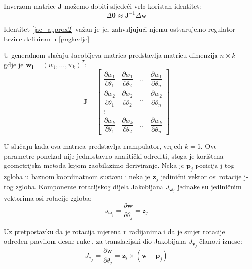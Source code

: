 \documentclass[times, utf8, diplomski, numeric]{fer}
\begin{document}
Inverzom matrice $\mathbf{J}$ možemo dobiti sljedeći vrlo koristan identitet:
\begin{equation}
\Delta \bm{\theta} \approx \mathbf{J}^{-1} \Delta \textbf{w}
\label{jac_approx2}
\end{equation}

Identitet \ref{jac_approx2} važan je jer zahvaljujući njemu ostvarujemo regulator brzine definiran u [poglavlje].

U generalnom slučaju Jacobijeva matrica predstavlja matricu dimenzija $n \times k$ gdje je $\mathbf{w_i} = (w_1, \ldots , w_k)^T$:
\begin{equation}
\mathbf{J} =
\begin{bmatrix}
    \dfrac{\partial {w_1}}{\partial \theta_{1}}      & \dfrac{\partial {w}_{1}}{\partial \theta_{2}}  & \dots & \dfrac{\partial {w}_{1}}{\partial \theta_{n}}  \\
    \dfrac{\partial{w}_{2}}{\partial \theta_{1}}      & \dfrac{\partial {w}_{2}}{\partial \theta_{2}}  & \dots & \dfrac{\partial {w}_{2}}{\partial \theta_{n}} \\
    \vdots \\
    \dfrac{\partial {w}_{k}}{\partial \theta_{1}}      & \dfrac{\partial {w}_{k}}{\partial \theta_{2}}  & \dots & \dfrac{\partial {w}_{k}}{\partial \theta_{n}}
\end{bmatrix}
\end{equation}

U slučaju kada ova matrica predstavlja manipulator, vrijedi $k=6$.
Ove parametre ponekad nije jednostavno analitički odrediti, stoga je korištena geometrijska metoda kojom zaobilazimo deriviranje. 
Neka je $\mathbf{p}_{j}$ pozicija j-tog zgloba u baznom koordinatnom sustavu i neka je $\mathbf{z}_{j}$ jedinični vektor osi rotacije j-tog zgloba. 
Komponente rotacijskog dijela Jakobijana $J_{\bm{\omega}_j}$ jednake su jediničnim vektorima osi rotacije zgloba: 
\begin{equation}
J_{\bm{\omega}_j} = \dfrac{\partial \textbf{w}}{ \partial \theta_{j}} = \textbf{z}_{j}
\end{equation}


Uz pretpostavku da je rotacija mjerena u radijanima i da je smjer rotacije određen pravilom desne ruke , za translacijski dio Jakobijana $J_{\bm{v}_j}$ članovi iznose:
\begin{equation}
J_{\bm{v}_j} = \dfrac{\partial \mathbf{w}}{ \partial \theta_{j}} = \mathbf{z}_{j} \times (\mathbf{w} - \mathbf{p}_{j})
\end{equation}
\end{document}
